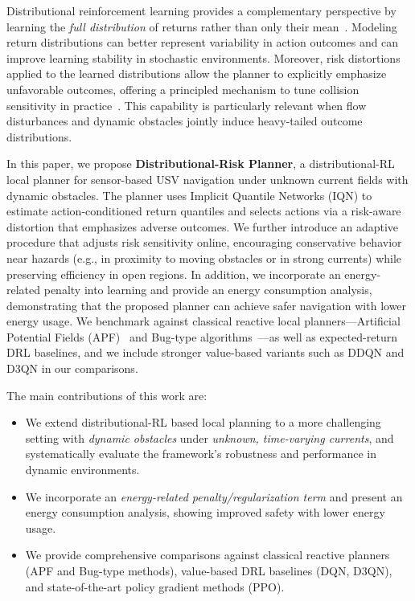Distributional reinforcement learning provides a complementary perspective by learning the \emph{full distribution} of returns rather than only their mean~\cite{ref7}.
Modeling return distributions can better represent variability in action outcomes and can improve learning stability in stochastic environments.
Moreover, risk distortions applied to the learned distributions allow the planner to explicitly emphasize unfavorable outcomes, offering a principled mechanism to tune collision sensitivity in practice~\cite{ref8}.
This capability is particularly relevant when flow disturbances and dynamic obstacles jointly induce heavy-tailed outcome distributions.

In this paper, we propose \textbf{Distributional-Risk Planner}, a distributional-RL local planner for sensor-based USV navigation under unknown current fields with dynamic obstacles.
The planner uses Implicit Quantile Networks (IQN) to estimate action-conditioned return quantiles and selects actions via a risk-aware distortion that emphasizes adverse outcomes.
We further introduce an adaptive procedure that adjusts risk sensitivity online, encouraging conservative behavior near hazards (e.g., in proximity to moving obstacles or in strong currents) while preserving efficiency in open regions.
In addition, we incorporate an energy-related penalty into learning and provide an energy consumption analysis, demonstrating that the proposed planner can achieve safer navigation with lower energy usage.
We benchmark against classical reactive local planners---Artificial Potential Fields (APF)~\cite{ref9,ref10} and Bug-type algorithms~\cite{ref11,ref12}---as well as expected-return DRL baselines, and we include stronger value-based variants such as DDQN and D3QN in our comparisons.

\smallskip
\noindent The main contributions of this work are:
\begin{itemize}
  \item We extend distributional-RL based local planning to a more challenging setting with \emph{dynamic obstacles} under \emph{unknown, time-varying currents}, and systematically evaluate the framework's robustness and performance in dynamic environments.
  \item We incorporate an \emph{energy-related penalty/regularization term} and present an energy consumption analysis, showing improved safety with lower energy usage.
  \item We provide comprehensive comparisons against classical reactive planners (APF and Bug-type methods), value-based DRL baselines (DQN, D3QN), and state-of-the-art policy gradient methods (PPO).
\end{itemize}

